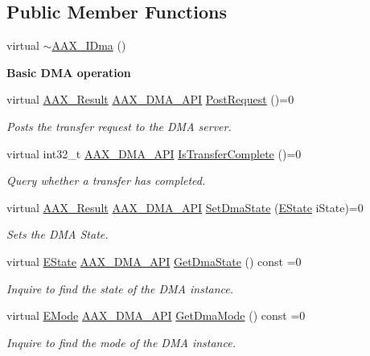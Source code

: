 \subsection*{Public Member Functions}
\begin{DoxyCompactItemize}
\item 
virtual \hyperlink{a00095_a6e3ec99b5c67a48fa9d53087c833a990}{$\sim$\+A\+A\+X\+\_\+\+I\+Dma} ()
\end{DoxyCompactItemize}
\begin{Indent}{\bf Basic D\+M\+A operation}\par
\begin{DoxyCompactItemize}
\item 
virtual \hyperlink{a00149_a4d8f69a697df7f70c3a8e9b8ee130d2f}{A\+A\+X\+\_\+\+Result} \hyperlink{a00243_acae60d01e5e4bd3282369d0d9d378f3f}{A\+A\+X\+\_\+\+D\+M\+A\+\_\+\+A\+P\+I} \hyperlink{a00095_ac732944930f4fce9c47b59fe278eddc1}{Post\+Request} ()=0
\begin{DoxyCompactList}\small\item\em Posts the transfer request to the D\+M\+A server. \end{DoxyCompactList}\item 
virtual int32\+\_\+t \hyperlink{a00243_acae60d01e5e4bd3282369d0d9d378f3f}{A\+A\+X\+\_\+\+D\+M\+A\+\_\+\+A\+P\+I} \hyperlink{a00095_a44981285d022e5ddee41d903eed68a7d}{Is\+Transfer\+Complete} ()=0
\begin{DoxyCompactList}\small\item\em Query whether a transfer has completed. \end{DoxyCompactList}\item 
virtual \hyperlink{a00149_a4d8f69a697df7f70c3a8e9b8ee130d2f}{A\+A\+X\+\_\+\+Result} \hyperlink{a00243_acae60d01e5e4bd3282369d0d9d378f3f}{A\+A\+X\+\_\+\+D\+M\+A\+\_\+\+A\+P\+I} \hyperlink{a00095_a4d1a182655fef78b18d564a5669bae18}{Set\+Dma\+State} (\hyperlink{a00095_a64e694fd40d32179e429eb7934a64842}{E\+State} i\+State)=0
\begin{DoxyCompactList}\small\item\em Sets the D\+M\+A State. \end{DoxyCompactList}\item 
virtual \hyperlink{a00095_a64e694fd40d32179e429eb7934a64842}{E\+State} \hyperlink{a00243_acae60d01e5e4bd3282369d0d9d378f3f}{A\+A\+X\+\_\+\+D\+M\+A\+\_\+\+A\+P\+I} \hyperlink{a00095_ab5cf4ad618853e4a94ed63a693d7b800}{Get\+Dma\+State} () const =0
\begin{DoxyCompactList}\small\item\em Inquire to find the state of the D\+M\+A instance. \end{DoxyCompactList}\item 
virtual \hyperlink{a00095_af8d0f19f2896dd6dbd126b919b24e39b}{E\+Mode} \hyperlink{a00243_acae60d01e5e4bd3282369d0d9d378f3f}{A\+A\+X\+\_\+\+D\+M\+A\+\_\+\+A\+P\+I} \hyperlink{a00095_a9bd67775d41c32da19d5532362fe86c8}{Get\+Dma\+Mode} () const =0
\begin{DoxyCompactList}\small\item\em Inquire to find the mode of the D\+M\+A instance. \end{DoxyCompactList}\end{DoxyCompactItemize}
\end{Indent}
